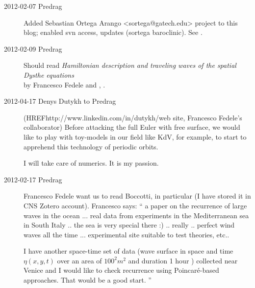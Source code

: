 \begin{description}
\item[2012-02-07 Predrag] Added Sebastian Ortega Arango
<sortega@gatech.edu> project to this blog; enabled svn access, updates
(sortega  baroclinic). See .

\item[2012-02-09 Predrag]
Should read
\emph{Hamiltonian description and traveling waves of the spatial Dysthe
 equations}
 \\
by Francesco Fedele and
,
.

\item[2012-04-17 Denys Dutykh to Predrag]
(HREF{http://www.linkedin.com/in/dutykh/}{web site}, Francesco Fedele's
collaborator) Before attacking the full Euler with free surface, we would
like to play with toy-models in our field like KdV, for example, to start
to apprehend this technology of periodic orbits.

I will take care of numerics. It is my passion.

\item[2012-02-17 Predrag]
Francesco Fedele want us to read Boccotti, in particular
 (I have stored it in CNS Zotero account). Francesco says:
``
a paper on the recurrence of large waves in the ocean ... real data
from experiments in the Mediterranean sea in South Italy .. the sea is
very special there :) .. really .. perfect wind waves all the time ...
experimental site suitable to test theories, etc..

I have another space-time set of data (wave surface in space and time
$\eta(x,y,t)$ over an area of $100^2 m^2$ and duration 1 hour ) collected near
Venice and I would like to check recurrence using Poincar\'e-based
approaches. That would be a good start.
''


\end{description}
